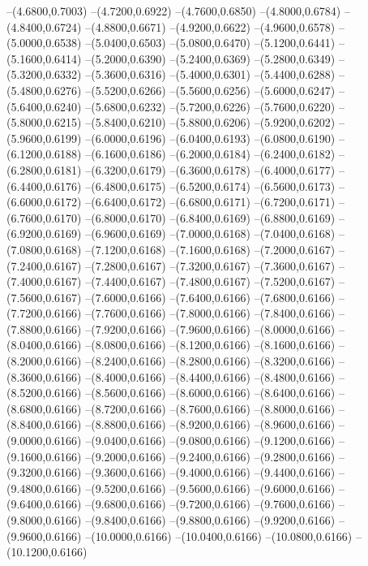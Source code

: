 {	--(4.6800,0.7003)
	--(4.7200,0.6922)
	--(4.7600,0.6850)
	--(4.8000,0.6784)
	--(4.8400,0.6724)
	--(4.8800,0.6671)
	--(4.9200,0.6622)
	--(4.9600,0.6578)
	--(5.0000,0.6538)
	--(5.0400,0.6503)
	--(5.0800,0.6470)
	--(5.1200,0.6441)
	--(5.1600,0.6414)
	--(5.2000,0.6390)
	--(5.2400,0.6369)
	--(5.2800,0.6349)
	--(5.3200,0.6332)
	--(5.3600,0.6316)
	--(5.4000,0.6301)
	--(5.4400,0.6288)
	--(5.4800,0.6276)
	--(5.5200,0.6266)
	--(5.5600,0.6256)
	--(5.6000,0.6247)
	--(5.6400,0.6240)
	--(5.6800,0.6232)
	--(5.7200,0.6226)
	--(5.7600,0.6220)
	--(5.8000,0.6215)
	--(5.8400,0.6210)
	--(5.8800,0.6206)
	--(5.9200,0.6202)
	--(5.9600,0.6199)
	--(6.0000,0.6196)
	--(6.0400,0.6193)
	--(6.0800,0.6190)
	--(6.1200,0.6188)
	--(6.1600,0.6186)
	--(6.2000,0.6184)
	--(6.2400,0.6182)
	--(6.2800,0.6181)
	--(6.3200,0.6179)
	--(6.3600,0.6178)
	--(6.4000,0.6177)
	--(6.4400,0.6176)
	--(6.4800,0.6175)
	--(6.5200,0.6174)
	--(6.5600,0.6173)
	--(6.6000,0.6172)
	--(6.6400,0.6172)
	--(6.6800,0.6171)
	--(6.7200,0.6171)
	--(6.7600,0.6170)
	--(6.8000,0.6170)
	--(6.8400,0.6169)
	--(6.8800,0.6169)
	--(6.9200,0.6169)
	--(6.9600,0.6169)
	--(7.0000,0.6168)
	--(7.0400,0.6168)
	--(7.0800,0.6168)
	--(7.1200,0.6168)
	--(7.1600,0.6168)
	--(7.2000,0.6167)
	--(7.2400,0.6167)
	--(7.2800,0.6167)
	--(7.3200,0.6167)
	--(7.3600,0.6167)
	--(7.4000,0.6167)
	--(7.4400,0.6167)
	--(7.4800,0.6167)
	--(7.5200,0.6167)
	--(7.5600,0.6167)
	--(7.6000,0.6166)
	--(7.6400,0.6166)
	--(7.6800,0.6166)
	--(7.7200,0.6166)
	--(7.7600,0.6166)
	--(7.8000,0.6166)
	--(7.8400,0.6166)
	--(7.8800,0.6166)
	--(7.9200,0.6166)
	--(7.9600,0.6166)
	--(8.0000,0.6166)
	--(8.0400,0.6166)
	--(8.0800,0.6166)
	--(8.1200,0.6166)
	--(8.1600,0.6166)
	--(8.2000,0.6166)
	--(8.2400,0.6166)
	--(8.2800,0.6166)
	--(8.3200,0.6166)
	--(8.3600,0.6166)
	--(8.4000,0.6166)
	--(8.4400,0.6166)
	--(8.4800,0.6166)
	--(8.5200,0.6166)
	--(8.5600,0.6166)
	--(8.6000,0.6166)
	--(8.6400,0.6166)
	--(8.6800,0.6166)
	--(8.7200,0.6166)
	--(8.7600,0.6166)
	--(8.8000,0.6166)
	--(8.8400,0.6166)
	--(8.8800,0.6166)
	--(8.9200,0.6166)
	--(8.9600,0.6166)
	--(9.0000,0.6166)
	--(9.0400,0.6166)
	--(9.0800,0.6166)
	--(9.1200,0.6166)
	--(9.1600,0.6166)
	--(9.2000,0.6166)
	--(9.2400,0.6166)
	--(9.2800,0.6166)
	--(9.3200,0.6166)
	--(9.3600,0.6166)
	--(9.4000,0.6166)
	--(9.4400,0.6166)
	--(9.4800,0.6166)
	--(9.5200,0.6166)
	--(9.5600,0.6166)
	--(9.6000,0.6166)
	--(9.6400,0.6166)
	--(9.6800,0.6166)
	--(9.7200,0.6166)
	--(9.7600,0.6166)
	--(9.8000,0.6166)
	--(9.8400,0.6166)
	--(9.8800,0.6166)
	--(9.9200,0.6166)
	--(9.9600,0.6166)
	--(10.0000,0.6166)
	--(10.0400,0.6166)
	--(10.0800,0.6166)
	--(10.1200,0.6166)
}
